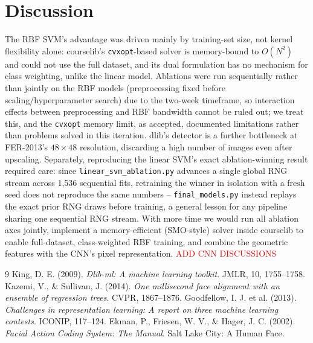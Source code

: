 \documentclass[10pt]{article}
\begin{document}
\section{Discussion}
The RBF SVM's advantage was driven mainly by training-set size, not kernel flexibility alone: courselib's \texttt{cvxopt}-based solver is memory-bound to $O(N^2)$ and could not use the full dataset, and its dual formulation has no mechanism for class weighting, unlike the linear model. Ablations were run sequentially rather than jointly on the RBF models (preprocessing fixed before scaling/hyperparameter search) due to the two-week timeframe, so interaction effects between preprocessing and RBF bandwidth cannot be ruled out; we treat this, and the \texttt{cvxopt} memory limit, as accepted, documented limitations rather than problems solved in this iteration. dlib's detector is a further bottleneck at FER-2013's $48\times48$ resolution, discarding a high number of images even after upscaling. Separately, reproducing the linear SVM's exact ablation-winning result required care: since \texttt{linear\_svm\_ablation.py} advances a single global RNG stream across 1{,}536 sequential fits, retraining the winner in isolation with a fresh seed does not reproduce the same numbers -- \texttt{final\_models.py} instead replays the exact prior RNG draws before training, a general lesson for any pipeline sharing one sequential RNG stream. With more time we would run all ablation axes jointly, implement a memory-efficient (SMO-style) solver inside courselib to enable full-dataset, class-weighted RBF training, and combine the geometric features with the CNN's pixel representation. \textcolor{red}{ADD CNN DISCUSSIONS}
\begin{thebibliography}{9}
\small
{} King, D. E. (2009). \textit{Dlib-ml: A machine learning toolkit}. JMLR, 10, 1755--1758.
 Kazemi, V., \& Sullivan, J. (2014). \textit{One millisecond face alignment with an ensemble of regression trees}. CVPR, 1867--1876.
 Goodfellow, I. J. et al. (2013). \textit{Challenges in representation learning: A report on three machine learning contests}. ICONIP, 117--124.
 Ekman, P., Friesen, W. V., \& Hager, J. C. (2002). \textit{Facial Action Coding System: The Manual}. Salt Lake City: A Human Face.
\end{thebibliography}
\end{document}
